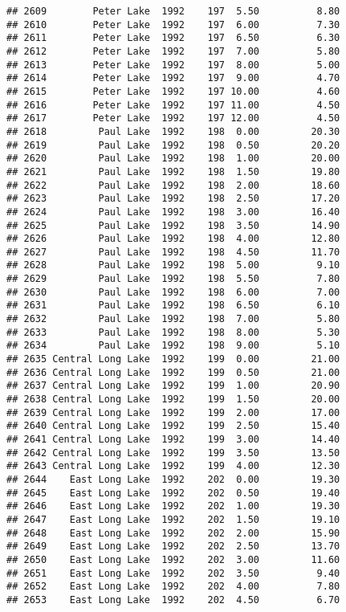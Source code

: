 \documentclass[
]{article}
\begin{document}
\begin{verbatim}
## 2609        Peter Lake  1992    197  5.50          8.80
## 2610        Peter Lake  1992    197  6.00          7.30
## 2611        Peter Lake  1992    197  6.50          6.30
## 2612        Peter Lake  1992    197  7.00          5.80
## 2613        Peter Lake  1992    197  8.00          5.00
## 2614        Peter Lake  1992    197  9.00          4.70
## 2615        Peter Lake  1992    197 10.00          4.60
## 2616        Peter Lake  1992    197 11.00          4.50
## 2617        Peter Lake  1992    197 12.00          4.50
## 2618         Paul Lake  1992    198  0.00         20.30
## 2619         Paul Lake  1992    198  0.50         20.20
## 2620         Paul Lake  1992    198  1.00         20.00
## 2621         Paul Lake  1992    198  1.50         19.80
## 2622         Paul Lake  1992    198  2.00         18.60
## 2623         Paul Lake  1992    198  2.50         17.20
## 2624         Paul Lake  1992    198  3.00         16.40
## 2625         Paul Lake  1992    198  3.50         14.90
## 2626         Paul Lake  1992    198  4.00         12.80
## 2627         Paul Lake  1992    198  4.50         11.70
## 2628         Paul Lake  1992    198  5.00          9.10
## 2629         Paul Lake  1992    198  5.50          7.80
## 2630         Paul Lake  1992    198  6.00          7.00
## 2631         Paul Lake  1992    198  6.50          6.10
## 2632         Paul Lake  1992    198  7.00          5.80
## 2633         Paul Lake  1992    198  8.00          5.30
## 2634         Paul Lake  1992    198  9.00          5.10
## 2635 Central Long Lake  1992    199  0.00         21.00
## 2636 Central Long Lake  1992    199  0.50         21.00
## 2637 Central Long Lake  1992    199  1.00         20.90
## 2638 Central Long Lake  1992    199  1.50         20.00
## 2639 Central Long Lake  1992    199  2.00         17.00
## 2640 Central Long Lake  1992    199  2.50         15.40
## 2641 Central Long Lake  1992    199  3.00         14.40
## 2642 Central Long Lake  1992    199  3.50         13.50
## 2643 Central Long Lake  1992    199  4.00         12.30
## 2644    East Long Lake  1992    202  0.00         19.30
## 2645    East Long Lake  1992    202  0.50         19.40
## 2646    East Long Lake  1992    202  1.00         19.30
## 2647    East Long Lake  1992    202  1.50         19.10
## 2648    East Long Lake  1992    202  2.00         15.90
## 2649    East Long Lake  1992    202  2.50         13.70
## 2650    East Long Lake  1992    202  3.00         11.60
## 2651    East Long Lake  1992    202  3.50          9.40
## 2652    East Long Lake  1992    202  4.00          7.80
## 2653    East Long Lake  1992    202  4.50          6.70

\end{verbatim}
\end{document}
